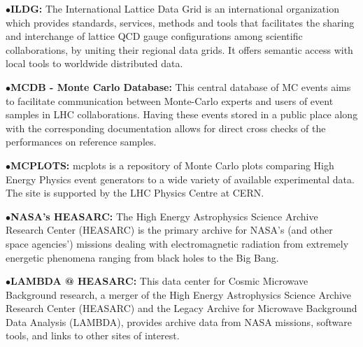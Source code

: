 \medskip

\item{$\bullet$}{\bf ILDG:} 
The International Lattice Data Grid is an international organization which provides standards, services, methods and tools that facilitates the sharing and interchange of lattice QCD gauge configurations among scientific collaborations, by uniting their regional data grids. It offers semantic access with local tools to worldwide distributed data.
	\item{}

\medskip

\item{$\bullet$}{\bf MCDB - Monte Carlo Database:} 
This central database of MC events aims to facilitate communication between Monte-Carlo experts and users of event samples in LHC collaborations. Having these events stored in a public place along with the corresponding documentation allows for direct cross checks of the performances on reference samples.
	\item{}

\medskip

\item{$\bullet$}{\bf MCPLOTS:} 
mcplots is a repository of Monte Carlo plots comparing High Energy Physics event generators to a wide variety of available experimental data. The site is supported by the LHC Physics Centre at CERN.
	\item{}

\medskip
\medskip


\medskip

\item{$\bullet$}{\bf NASA's HEASARC:} 
The High Energy Astrophysics Science Archive Research Center (HEASARC) is the primary archive for NASA's (and other space agencies') missions dealing with electromagnetic radiation from extremely energetic phenomena ranging from black holes to the Big Bang.
	\item{} 

\medskip

\item{$\bullet$}{\bf LAMBDA @ HEASARC:} 
This data center for Cosmic Microwave Background research, a merger of the High Energy Astrophysics Science Archive Research Center (HEASARC) and the Legacy Archive for Microwave Background Data Analysis (LAMBDA), provides archive data from NASA missions, software tools, and links to other sites of interest.
	\item{}

